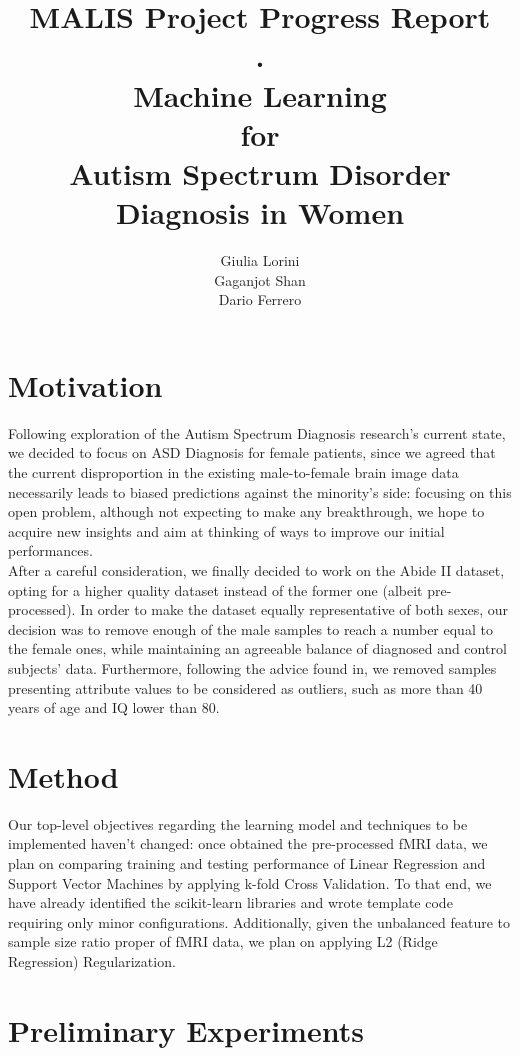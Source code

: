 \documentclass{article}
\title{MALIS Project Progress Report\\.\\Machine Learning\\for\\Autism Spectrum Disorder Diagnosis in Women}
\author{
Giulia Lorini\\
Gaganjot Shan\\
Dario Ferrero\\
}
\begin{document}
\maketitle

\section{Motivation}

Following exploration of the Autism Spectrum Diagnosis research's current state, we decided to focus on ASD Diagnosis for female patients, since we agreed that the current disproportion in the existing male-to-female brain image data necessarily leads to biased predictions against the minority's side: focusing on this open problem, although not expecting to make any breakthrough, we hope to acquire new insights and aim at thinking of ways to improve our initial performances.\\

After a careful consideration, we finally decided to work on the Abide II dataset, opting for a higher quality dataset instead of the former one (albeit pre-processed). In order to make the dataset equally representative of both sexes, our decision was to remove enough of the male samples to reach a number equal to the female ones, while maintaining an agreeable balance of diagnosed and control subjects' data. Furthermore, following the advice found in\cite{guidelinesml}, we removed samples presenting attribute values to be considered as outliers, such as more than 40 years of age and IQ lower than 80.

\section{Method}

Our top-level objectives regarding the learning model and techniques to be implemented haven't changed: once obtained the pre-processed fMRI data, we plan on comparing training and testing performance of Linear Regression and Support Vector Machines by applying k-fold Cross Validation. To that end, we have already identified the scikit-learn libraries and wrote template code requiring only minor configurations. Additionally, given the unbalanced feature to sample size ratio proper of fMRI data, we plan on applying L2 (Ridge Regression) Regularization.

\section{Preliminary Experiments}
\end{document}

